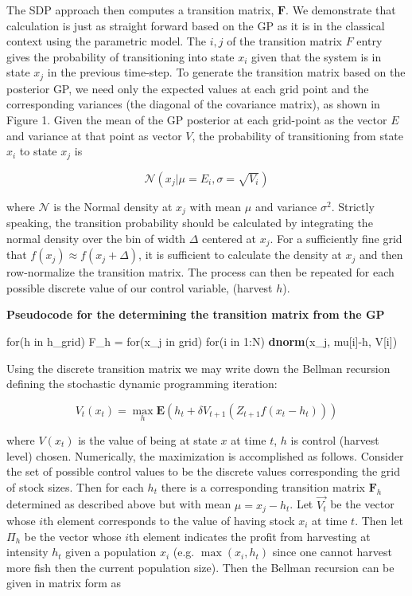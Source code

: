 \documentclass[author-year, review]{elsarticle} %
\newenvironment{Shaded}{}{}
\newcommand{\KeywordTok}[1]{\textcolor[rgb]{0.00,0.44,0.13}{\textbf{{#1}}}}
\newcommand{\DecValTok}[1]{\textcolor[rgb]{0.25,0.63,0.44}{{#1}}}
\newcommand{\StringTok}[1]{\textcolor[rgb]{0.25,0.44,0.63}{{#1}}}
\newcommand{\NormalTok}[1]{{#1}}
\begin{document}
The SDP approach then computes a transition matrix, $\mathbf{F}$. We
demonstrate that calculation is just as straight forward based on the GP
as it is in the classical context using the parametric model. The
${i,j}$ of the transition matrix $F$ entry gives the probability of
transitioning into state $x_i$ given that the system is in state $x_j$
in the previous time-step. To generate the transition matrix based on
the posterior GP, we need only the expected values at each grid point
and the corresponding variances (the diagonal of the covariance matrix),
as shown in Figure 1. Given the mean of the GP posterior at each
grid-point as the vector $E$ and variance at that point as vector $V$,
the probability of transitioning from state $x_i$ to state $x_j$ is

\[\mathcal{N}\left(x_j | \mu = E_i, \sigma = \sqrt{V_i}\right)\]

where $\mathcal{N}$ is the Normal density at $x_j$ with mean $\mu$ and
variance $\sigma^2$. Strictly speaking, the transition probability
should be calculated by integrating the normal density over the bin of
width $\Delta$ centered at $x_j$. For a sufficiently fine grid that
$f(x_j) \approx f(x_j + \Delta)$, it is sufficient to calculate the
density at $x_j$ and then row-normalize the transition matrix. The
process can then be repeated for each possible discrete value of our
control variable, (harvest $h$).

\textbf{Pseudocode for the determining the transition matrix from the
GP}

\begin{Shaded}
\begin{Highlighting}[]
\NormalTok{for(h in h_grid)}
  \NormalTok{F_h =}\StringTok{ }\NormalTok{for(x_j in grid)}
          \NormalTok{for(i in }\DecValTok{1}\NormalTok{:N) }
            \KeywordTok{dnorm}\NormalTok{(x_j, mu[i]-h, V[i])}
\end{Highlighting}
\end{Shaded}

Using the discrete transition matrix we may write down the Bellman
recursion defining the stochastic dynamic programming iteration:

\begin{equation}
V_t(x_t) = \max_h \mathbf{E} \left( h_t + \delta V_{t+1}( Z_{t+1} f(x_t - h_t)) \right)
\end{equation}

where $V(x_t)$ is the value of being at state $x$ at time $t$, $h$ is
control (harvest level) chosen. Numerically, the maximization is
accomplished as follows. Consider the set of possible control values to
be the discrete values corresponding the grid of stock sizes. Then for
each $h_t$ there is a corresponding transition matrix $\mathbf{F}_h$
determined as described above but with mean $\mu = x_j - h_t$. Let
$\vec{V_t}$ be the vector whose $i$th element corresponds to the value
of having stock $x_i$ at time $t$. Then let $\Pi_h$ be the vector whose
$i$th element indicates the profit from harvesting at intensity $h_t$
given a population $x_i$ (e.g. $\max(x_i, h_t)$ since one cannot harvest
more fish then the current population size). Then the Bellman recursion
can be given in matrix form as
\end{document}

